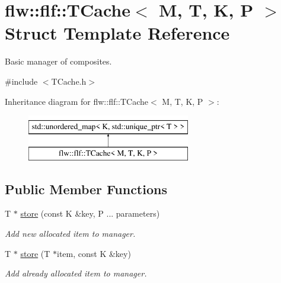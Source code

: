 \hypertarget{structflw_1_1flf_1_1TCache}{}\section{flw\+:\+:flf\+:\+:T\+Cache$<$ M, T, K, P $>$ Struct Template Reference}
\label{structflw_1_1flf_1_1TCache}


Basic manager of composites.  




{\ttfamily \#include $<$T\+Cache.\+h$>$}

Inheritance diagram for flw\+:\+:flf\+:\+:T\+Cache$<$ M, T, K, P $>$\+:\begin{figure}[H]
\begin{center}
\leavevmode
\includegraphics[height=2.000000cm]{structflw_1_1flf_1_1TCache}
\end{center}
\end{figure}
\subsection*{Public Member Functions}
\begin{DoxyCompactItemize}
\item 
\mbox{\label{structflw_1_1flf_1_1TCache_aab15250e82a33a6087e8b56ef6833e24}} 
T $\ast$ \hyperlink{structflw_1_1flf_1_1TCache_aab15250e82a33a6087e8b56ef6833e24}{store} (const K \&key, P ... parameters)
\begin{DoxyCompactList}\small\item\em Add new allocated item to manager. \end{DoxyCompactList}\item 
\mbox{\label{structflw_1_1flf_1_1TCache_a6076917fba41b9e16ffd24dc95c16865}} 
T $\ast$ \hyperlink{structflw_1_1flf_1_1TCache_a6076917fba41b9e16ffd24dc95c16865}{store} (T $\ast$item, const K \&key)
\begin{DoxyCompactList}\small\item\em Add already allocated item to manager. \end{DoxyCompactList}\end{DoxyCompactItemize}


